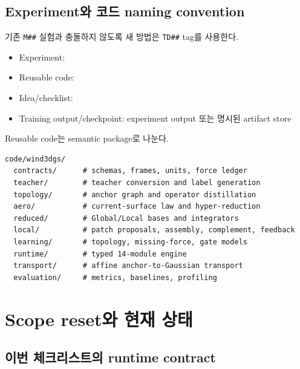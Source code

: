 \documentclass[10pt,a4paper]{article}
\newcommand{\code}[1]{\texttt{#1}}
\begin{document}
\subsection{Experiment와 코드 naming convention}

기존 \code{M\#\#} 실험과 충돌하지 않도록 새 방법은 \code{TD\#\#} tag를 사용한다.

\begin{tcolorbox}[colback=LightGray,colframe=black!20,title=권장 경로,fonttitle=\bfseries]
\begin{itemize}
  \item Experiment: 
  \item Reusable code: 
  \item Idea/checklist: 
  \item Training output/checkpoint: experiment output 또는 명시된 artifact store
\end{itemize}
\end{tcolorbox}

Reusable code는 semantic package로 나눈다.

\begin{lstlisting}
code/wind3dgs/
  contracts/      # schemas, frames, units, force ledger
  teacher/        # teacher conversion and label generation
  topology/       # anchor graph and operator distillation
  aero/           # current-surface law and hyper-reduction
  reduced/        # Global/Local bases and integrators
  local/          # patch proposals, assembly, complement, feedback
  learning/       # topology, missing-force, gate models
  runtime/        # typed 14-module engine
  transport/      # affine anchor-to-Gaussian transport
  evaluation/     # metrics, baselines, profiling
\end{lstlisting}

\section{Scope reset와 현재 상태}

\subsection{이번 체크리스트의 runtime contract}
\end{document}
